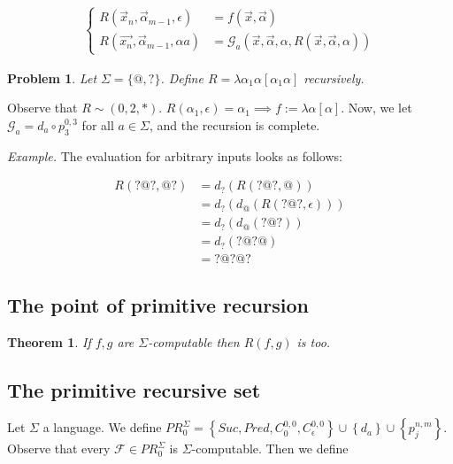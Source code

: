 \documentclass[a4paper, 12pt]{article}
\newtheorem{problem}{Problem}
\newtheorem{theorem}{Theorem}
\newtheorem{problem}{Problem}
\newtheorem{theorem}{Theorem}
\begin{document}
\begin{align*}
    \begin{cases}
        R(\overrightarrow{x}_n, \overrightarrow{\alpha}_{m-1}, \epsilon) &=
        f(\overrightarrow{x}, \overrightarrow{\alpha}) \\ 
        R(\overrightarrow{x_n}, \overrightarrow{\alpha}_{m-1}, \alpha a)&= \mathcal{G}_a
        \left( \overrightarrow{x}, \overrightarrow{\alpha},
        \alpha, R(\overrightarrow{x}, \overrightarrow{\alpha}, \alpha) \right) 
    \end{cases}
\end{align*}

\begin{problem}
    Let $\Sigma = \{ @, ? \}$. Define $R = \lambda \alpha_1 \alpha [ \alpha_1
    \alpha ]$ recursively.
\end{problem}

Observe that $R \sim (0, 2, *)$. $R(\alpha_1, \epsilon) = \alpha_1 \implies f :=
\lambda \alpha[\alpha]$. Now, we let $\mathcal{G}_{a} = d_a \circ p_{3}^{0, 3}$
for all $a \in \Sigma$, and the recursion is complete.

\textit{Example.} The evaluation for arbitrary inputs looks as follows:

\begin{align*}
    R(?@?, @?) &= d_? \left( R(?@?, @) \right)  \\ 
               &= d_? \left( d_@ \left( R(?@?, \epsilon) \right)  \right)  \\ 
               &= d_? \left(  d_@ \left( ?@? \right)  \right)  \\ 
               &= d_? \left( ?@?@ \right) \\ 
               &= ?@?@?
\end{align*}

\subsection{The point of primitive recursion}

\begin{theorem}
    If $f, g$ are $\Sigma$-computable then $R(f, g)$ is too.
\end{theorem}

\subsection{The primitive recursive set}

Let $\Sigma$ a language. We define $PR_0^{\Sigma} = \left\{ Suc, Pred, C_0^{0,
0}, C_{\epsilon}^{0, 0} \right\} \cup \left\{ d_a \right\} \cup \left\{ p_j^{n,
m} \right\}  $. Observe that every $\mathcal{F} \in PR_0^{\Sigma}$ is
$\Sigma$-computable. Then we define 
\end{document}
